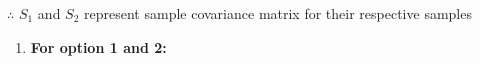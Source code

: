 \documentclass[journal,12pt,twocolumn]{IEEEtran}
\theoremstyle{remark}
\begin{document}
$\therefore$ $S_1$ and $S_2$ represent sample covariance matrix for their respective samples\\
\begin{enumerate}
	\item \textbf{For option 1 and 2:}\\

\end{enumerate}
\end{document}
